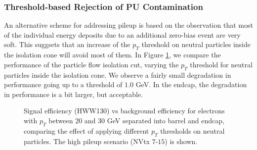 \subsubsection{Threshold-based Rejection of PU Contamination}
\label{sec:ThresholdBasedIsolation}

An alternative scheme for addressing pileup is based on the observation that most of the 
individual energy deposits due to an additional zero-bias event are very soft. This suggsets 
that an increase of the $p_{T}$ threshold on neutral 
particles inside the isolation cone will avoid most of them. 
In Figure \ref{fig:IsoPerformance_Ele_PtThresholds}, we compare the performance
of the particle flow isolation cut, varying the $p_{T}$ threshold for neutral particles
inside the isolation cone. We observe a fairly small degradation in performance going up
to a threshold of $1.0$ GeV. In the endcap, the degradation in performance is a bit
larger, but acceptable. 

\begin{figure}[!htbp]
\begin{center}
\caption{Signal efficiency (HWW130) vs background efficiency for electrons with $p_{T}$ between $20$ and $30$ GeV
separated into barrel and endcap, comparing the effect of applying different $p_{T}$ thresholds on neutral particles.
The high pileup scenario (NVtx $7$-$15$) is shown.}
\label{fig:IsoPerformance_Ele_PtThresholds}
\end{center}
\end{figure}


